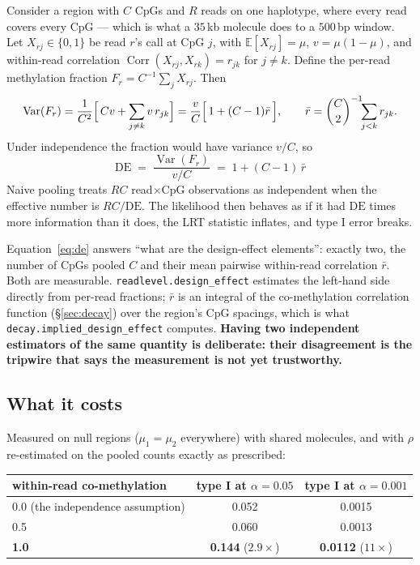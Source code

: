 \documentclass[11pt]{article}
\DeclareMathOperator{\Var}{Var}
\DeclareMathOperator{\Corr}{Corr}
\begin{document}
Consider a region with $C$ CpGs and $R$ reads on one haplotype, where every read
covers every CpG --- which is what a $35$\,kb molecule does to a $500$\,bp
window. Let $X_{rj} \in \{0,1\}$ be read $r$'s call at CpG $j$, with
$\mathbb{E}[X_{rj}] = \mu$, $v = \mu(1-\mu)$, and within-read correlation
$\Corr(X_{rj}, X_{rk}) = r_{jk}$ for $j \neq k$. Define the per-read methylation
fraction $F_r = C^{-1}\sum_j X_{rj}$. Then
\begin{equation}
\Var(F_r) = \frac{1}{C^2}\Bigl[\, C v + \sum_{j\neq k} v\, r_{jk} \Bigr]
= \frac{v}{C}\Bigl[\,1 + (C-1)\bar r\,\Bigr],
\qquad
\bar r = \binom{C}{2}^{-1}\!\!\sum_{j<k} r_{jk}.
\end{equation}
Under independence the fraction would have variance $v/C$, so
\begin{equation}
\boxed{\;\mathrm{DE} \;=\; \frac{\Var(F_r)}{v/C} \;=\; 1 + (C-1)\,\bar r\;}
\label{eq:de}
\end{equation}
Naive pooling treats $RC$ read$\times$CpG observations as independent when the
effective number is $RC/\mathrm{DE}$. The likelihood then behaves as if it had
$\mathrm{DE}$ times more information than it does, the LRT statistic inflates,
and type I error breaks.

Equation~\eqref{eq:de} answers ``what are the design-effect elements'': exactly
two, the number of CpGs pooled $C$ and their mean pairwise within-read
correlation $\bar r$. Both are measurable.
\texttt{readlevel.design\_effect} estimates the left-hand side directly from
per-read fractions; $\bar r$ is an integral of the co-methylation correlation
function (\S\ref{sec:decay}) over the region's CpG spacings, which is what
\texttt{decay.implied\_design\_effect} computes. \textbf{Having two independent
estimators of the same quantity is deliberate: their disagreement is the
tripwire that says the measurement is not yet trustworthy.}

\subsection{What it costs}

Measured on null regions ($\mu_1 = \mu_2$ everywhere) with shared molecules, and
with $\rho$ re-estimated on the pooled counts exactly as prescribed:

\begin{center}
\small
\begin{tabular}{lcc}
\toprule
within-read co-methylation & type I at $\alpha = 0.05$ & type I at $\alpha = 0.001$ \\
\midrule
0.0 (the independence assumption) & 0.052 & 0.0015 \\
0.5 & 0.060 & 0.0013 \\
\textbf{1.0} & \textbf{0.144} ($2.9\times$) & \textbf{0.0112} ($11\times$) \\
\bottomrule
\end{tabular}
\end{center}
\end{document}
